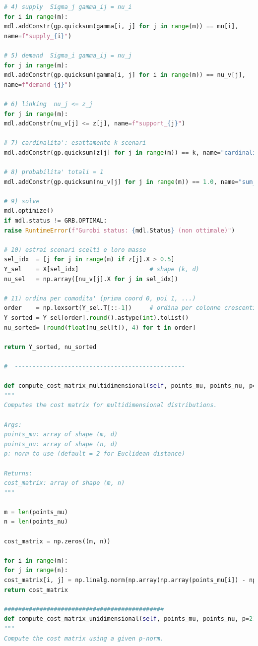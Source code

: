 \documentclass[a4paper,12pt]{article}
\begin{document}
\begin{lstlisting}[language=python,caption={class ScenarioTree},label={lst:class-scenario-tree}]
# 4) supply  Sigma_j gamma_ij = nu_i
for i in range(m):
mdl.addConstr(gp.quicksum(gamma[i, j] for j in range(m)) == mu[i],
name=f"supply_{i}")

# 5) demand  Sigma_i gamma_ij = nu_j
for j in range(m):
mdl.addConstr(gp.quicksum(gamma[i, j] for i in range(m)) == nu_v[j],
name=f"demand_{j}")

# 6) linking  nu_j <= z_j
for j in range(m):
mdl.addConstr(nu_v[j] <= z[j], name=f"support_{j}")

# 7) cardinalita': esattamente k scenari
mdl.addConstr(gp.quicksum(z[j] for j in range(m)) == k, name="cardinality")

# 8) probabilita' totali = 1
mdl.addConstr(gp.quicksum(nu_v[j] for j in range(m)) == 1.0, name="sum_prob")

# 9) solve
mdl.optimize()
if mdl.status != GRB.OPTIMAL:
raise RuntimeError(f"Gurobi status: {mdl.Status} (non ottimale)")

# 10) estrai scenari scelti e loro masse
sel_idx  = [j for j in range(m) if z[j].X > 0.5]
Y_sel    = X[sel_idx]                    # shape (k, d)
nu_sel   = np.array([nu_v[j].X for j in sel_idx])

# 11) ordina per comodita' (prima coord 0, poi 1, ...)
order    = np.lexsort(Y_sel.T[::-1])     # ordina per colonne crescenti
Y_sorted = Y_sel[order].round().astype(int).tolist()
nu_sorted= [round(float(nu_sel[t]), 4) for t in order]

return Y_sorted, nu_sorted

#  ------------------------------------------------

def compute_cost_matrix_multidimensional(self, points_mu, points_nu, p=2):
"""
Computes the cost matrix for multidimensional distributions.

Args:
points_mu: array of shape (m, d)
points_nu: array of shape (n, d)
p: norm to use (default = 2 for Euclidean distance)

Returns:
cost_matrix: array of shape (m, n)
"""

m = len(points_mu)
n = len(points_nu)

cost_matrix = np.zeros((m, n))

for i in range(m):
for j in range(n):
cost_matrix[i, j] = np.linalg.norm(np.array(np.array(points_mu[i]) - np.array(points_nu[j])), ord=p)
return cost_matrix

#############################################
def compute_cost_matrix_unidimensional(self, points_mu, points_nu, p=2):
"""
Compute the cost matrix using a given p-norm.


\end{lstlisting}
\end{document}
